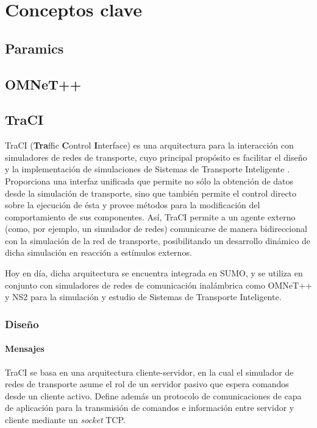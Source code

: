 \chapter{Conceptos clave}

\section{Paramics}
\section{OMNeT++}
\section{TraCI}
TraCI (\textbf{Tra}ffic \textbf{C}ontrol \textbf{I}nterface) es una arquitectura para la interacción con simuladores de redes de transporte, cuyo principal propósito es facilitar el diseño y la implementación de simulaciones de Sistemas de Transporte Inteligente \cite{traci}. Proporciona una interfaz unificada que permite no sólo la obtención de datos desde la simulación de transporte, sino que también permite el control directo sobre la ejecución de ésta y provee métodos para la modificación del comportamiento de sus componentes. Así, TraCI permite a un agente externo (como, por ejemplo, un simulador de redes) comunicarse de manera bidireccional con la simulación de la red de transporte, posibilitando un desarrollo dinámico de dicha simulación en reacción a estímulos externos.

Hoy en día, dicha arquitectura se encuentra integrada en SUMO, y se utiliza en conjunto con simuladores de redes de comunicación inalámbrica como OMNeT++ y NS2 para la simulación y estudio de Sistemas de Transporte Inteligente.

\subsection{Diseño}
\subsubsection{Mensajes}

TraCI se basa en una arquitectura cliente-servidor, en la cual el simulador de redes de transporte asume el rol de un servidor pasivo que espera comandos desde un cliente activo. Define además un protocolo de comunicaciones de capa de aplicación para la transmisión de comandos e información entre servidor y cliente mediante un \emph{socket} TCP.

